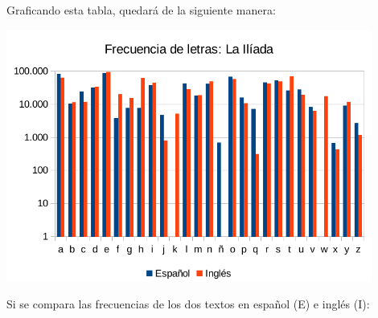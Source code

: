 \documentclass[12pt,a4paper,twoside]{book}
\begin{document}
Graficando esta tabla, quedará de la siguiente manera:

\includegraphics[width=0.9\textwidth]{img/frec-letras-2.pdf} 

Si se compara las frecuencias de los dos textos en español (E) e inglés (I):
\end{document}
